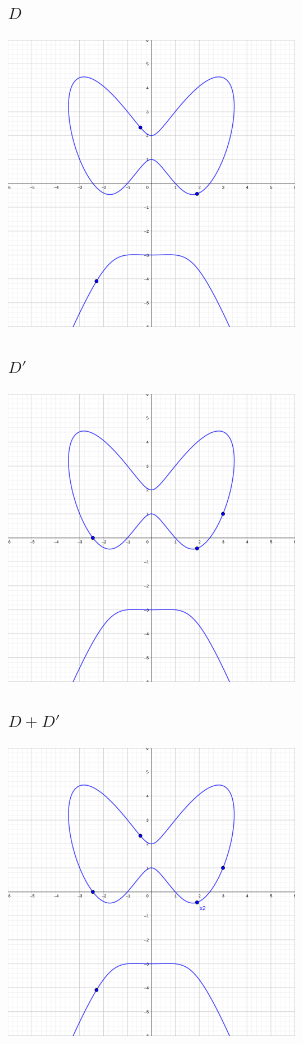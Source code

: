 \documentclass{beamer}
\begin{document}

\begin{frame}
\frametitle{$D$}
  \begin{center} \includegraphics[height=7.6cm]{d1.png} \end{center}
\end{frame}
\begin{frame}
\frametitle{$D'$}
  \begin{center} \includegraphics[height=7.6cm]{d2.png} \end{center}
\end{frame}
\begin{frame}
\frametitle{$D + D'$}
  \begin{center} \includegraphics[height=7.6cm]{d1_d2.png} \end{center}
\end{frame}
\end{document}
